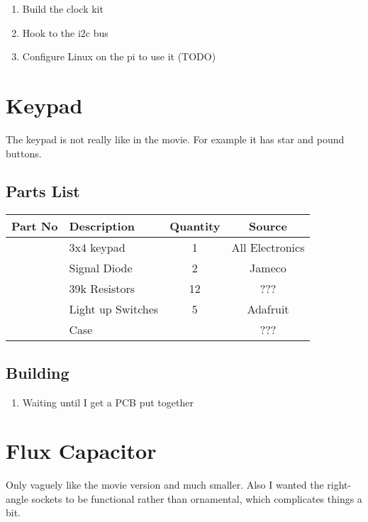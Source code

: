 \documentclass[11pt]{article}
\begin{document}
\begin{enumerate}
\item Build the clock kit
\item Hook to the i2c bus
\item Configure Linux on the pi to use it (TODO)
\end{enumerate}


\pagebreak
\section{Keypad}

The keypad is not really like in the movie.  For example
it has star and pound buttons.


\subsection{Parts List}

\begin{tabular}{|c|l|c|c|}
\hline
Part No	&  Description			&  Quantity	& Source \\
\hline
\hline
	& 3x4 keypad		& 1		& All Electronics \\
\hline
	& Signal Diode		& 2		& Jameco \\
\hline
	& 39k Resistors		& 12		& ??? \\

\hline
	& Light up Switches 	& 5		& Adafruit \\
\hline
	& Case			&		& ??? \\
\hline
\end{tabular}

\subsection{Building}

\begin{enumerate}
\item Waiting until I get a PCB put together
\end{enumerate}

\pagebreak
\section{Flux Capacitor}

Only vaguely like the movie version and much smaller.
Also I wanted the right-angle sockets to be functional rather
than ornamental, which complicates things a bit.
\end{document}
